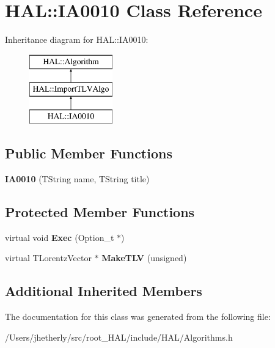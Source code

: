 \hypertarget{class_h_a_l_1_1_i_a0010}{\section{H\-A\-L\-:\-:I\-A0010 Class Reference}
\label{class_h_a_l_1_1_i_a0010}
}
Inheritance diagram for H\-A\-L\-:\-:I\-A0010\-:\begin{figure}[H]
\begin{center}
\leavevmode
\includegraphics[height=3.000000cm]{class_h_a_l_1_1_i_a0010}
\end{center}
\end{figure}
\subsection*{Public Member Functions}
\begin{DoxyCompactItemize}
\item 
\hypertarget{class_h_a_l_1_1_i_a0010_a019328281bbe7934bda23775b45cbe1a}{{\bfseries I\-A0010} (T\-String name, T\-String title)}\label{class_h_a_l_1_1_i_a0010_a019328281bbe7934bda23775b45cbe1a}

\end{DoxyCompactItemize}
\subsection*{Protected Member Functions}
\begin{DoxyCompactItemize}
\item 
\hypertarget{class_h_a_l_1_1_i_a0010_aeb97ff037be8078385f303643ae0b5f7}{virtual void {\bfseries Exec} (Option\-\_\-t $\ast$)}\label{class_h_a_l_1_1_i_a0010_aeb97ff037be8078385f303643ae0b5f7}

\item 
\hypertarget{class_h_a_l_1_1_i_a0010_a2bf414a4ed29feb050fcffb6d093057e}{virtual T\-Lorentz\-Vector $\ast$ {\bfseries Make\-T\-L\-V} (unsigned)}\label{class_h_a_l_1_1_i_a0010_a2bf414a4ed29feb050fcffb6d093057e}

\end{DoxyCompactItemize}
\subsection*{Additional Inherited Members}


The documentation for this class was generated from the following file\-:\begin{DoxyCompactItemize}
\item 
/\-Users/jhetherly/src/root\-\_\-\-H\-A\-L/include/\-H\-A\-L/Algorithms.\-h\end{DoxyCompactItemize}
